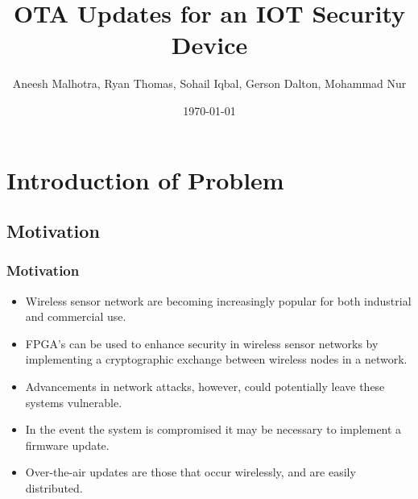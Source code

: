 \documentclass{beamer}
\title{OTA Updates for an IOT Security Device}
\author{Aneesh Malhotra, Ryan Thomas, Sohail Iqbal, Gerson Dalton, Mohammad Nur}
\date{\today}
\begin{document}
\frame{\titlepage}

\section[Outline]{}
\frame{\tableofcontents}

\section{Introduction of Problem}
\subsection{Motivation}
\frame
{
  \frametitle{Motivation}
  
  \begin{itemize}
  \item Wireless sensor network are becoming increasingly popular for both industrial and commercial use.
  \item FPGA's can be used to enhance security in wireless sensor networks by implementing a cryptographic exchange between wireless nodes in a network.  \cite{sen_security_2013} \cite{g_elliptic_2016}
  \item Advancements in network attacks, however, could potentially leave these systems vulnerable. 
  \item In the event the system is compromised it may be necessary to implement a firmware update.
  \item Over-the-air updates are those that occur wirelessly, and are easily distributed.
  \end{itemize}
}
\end{document}
